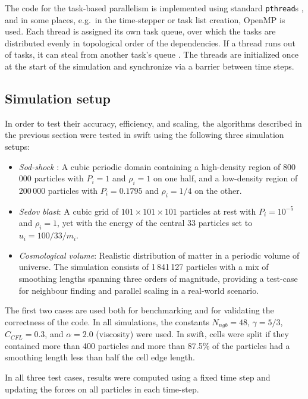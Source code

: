 \documentclass[a4paper,conference]{IEEEtran}
\newcommand{\swift}
    {{\sc swift}\xspace}
\begin{document}
The code for the task-based parallelism is implemented using
standard {\tt pthread}s \cite{ref:pthreads}, and in some places,
e.g.~in the time-stepper
or task list creation, OpenMP is used.
Each thread is assigned its own task queue, over which the tasks
are distributed evenly in topological order of the dependencies.
If a thread runs out of tasks, it can steal from another task's
queue \cite{ref:Blumofe1999}.
The threads are initialized once at the start of the simulation
and synchronize via a barrier between time steps.


\subsection{Simulation setup}

In order to test their accuracy, efficiency, and scaling,
the algorithms described in the previous section
were tested in \swift using the following three
simulation setups:
%
\begin{itemize}
    \item {\em Sod-shock} \cite{ref:Sod1978}: A cubic periodic domain containing a
        high-density region of
        800\,000 particles with $P_i=1$ and $\rho_i=1$ on one half,
        and a low-density region of 200\,000
        particles with $P_i=0.1795$ and $\rho_i=1/4$ on the other.
    \item {\em Sedov blast}: A cubic grid of $101\times 101\times 101$
        particles at rest with $P_i=10^{-5}$ and $\rho_i=1$, yet with the
        energy of the central 33 particles set to
        $u_i=100/33/m_i$.
    \item {\em Cosmological volume}: Realistic distribution of matter
        in a periodic volume of universe. The simulation consists
        of 1\,841\,127 particles with
        a mix of smoothing lengths spanning three orders of magnitude,
        providing a test-case for neighbour finding and parallel
        scaling in a real-world scenario.
\end{itemize}
%
The first two cases are used both for benchmarking and for
validating the correctness of the code.
In all simulations, the constants $N_{ngb}=48$, $\gamma=5/3$,
$C_{CFL}=0.3$, and $\alpha = 2.0$ (viscosity) were used.
In \swift, cells were split if they contained more than 400
particles and more than 87.5\% of the particles had a smoothing
length less than half the cell edge length.

In all three test cases, results were
computed using a fixed time step and updating the forces on all
particles in each time-step.
\end{document}
